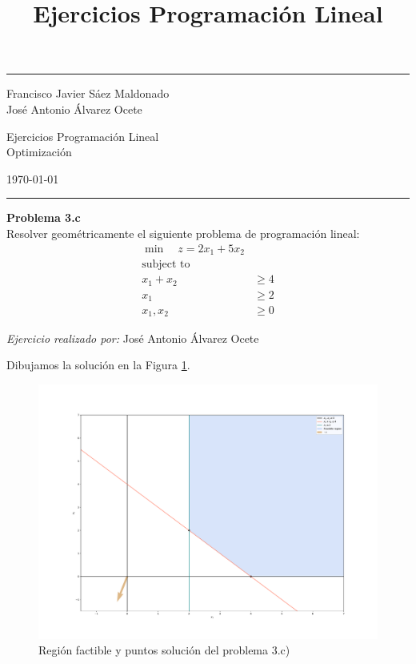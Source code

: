 \documentclass[11pt,table]{article}
\title{Ejercicios Programación Lineal}
\newenvironment{problem}[2][Problema]
    { \begin{mdframed}[backgroundcolor=gray!20] \textbf{#1 #2} \\}
    {  \end{mdframed}}
\begin{document}
    

\fancyhead[C]{}
\hrule \medskip %
\begin{minipage}{0.295\textwidth}
\raggedright
\footnotesize
Francisco Javier Sáez Maldonado \hfill\\
José Antonio Álvarez Ocete \hfill\\
\end{minipage}
\begin{minipage}{0.4\textwidth}
\centering
\large
Ejercicios Programación Lineal\\
\normalsize
Optimización\\
\end{minipage}
\begin{minipage}{0.295\textwidth}
\raggedleft
\today\hfill\\
\end{minipage}
\medskip\hrule
\bigskip


    
\begin{problem}{3.c}
Resolver geométricamente el siguiente problema de programación lineal:
\begin{align*}
\min \quad z  = 2x_1 + 5x_2\\
\text{subject to} \\
x_1 + x_2 & \geq 4 \\
x_1 & \geq 2\\
x_1,x_2 & \geq 0
\end{align*}
    \end{problem}

\emph{Ejercicio realizado por:} José Antonio Álvarez Ocete


Dibujamos la solución en la Figura \ref{fig:ej3c}.

\begin{figure}
    \centering  
    \includegraphics[scale=0.8]{Ej3c}
    \caption{Región factible y puntos solución del problema 3.c)}
    \label{fig:ej3c}
\end{figure}
\end{document}
